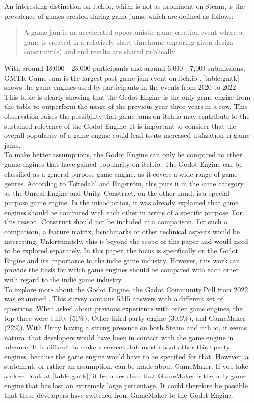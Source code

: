 An interesting distinction on itch.io, which is not as prominent on Steam, is the prevalence of games created during game jams, which are defined as follows:
\blockquote{A game jam is an accelerated opportunistic game creation event where a game is created in a relatively short timeframe exploring given design constraint(s) and end results are shared publically \cite{game-jam-definition}.}
With around 18,000 - 23,000 participants and around 6,000 - 7,000 submissions, GMTK Game Jam is the largest past game jam event on itch.io \cite{gmtk-game-jam-2021, gmtk-game-jam-2022, gmtk-game-jam-2023}.
\autoref{table:gmtk} shows the game engines used by participants in the events from 2020 to 2022.
This table is clearly showing that the Godot Engine is the only game engine from the table to outperform the usage of the previous year three years in a row.
This observation raises the possibility that game jams on itch.io may contribute to the sustained relevance of the Godot Engine.
It is important to consider that the overall popularity of a game engine could lead to its increased utilization in game jams. \\

To make better assumptions, the Godot Engine can only be compared to other game engines that have gained popularity on itch.io.
The Godot Engine can be classified as a general-purpose game engine, as it covers a wide range of game genres.
According to Toftedahl and Engström, this puts it in the same category as the Unreal Engine and Unity.
Construct, on the other hand, is a special purpose game engine.
In the introduction, it was already explained that game engines should be compared with each other in terms of a specific purpose.
For this reason, Construct should not be included in a comparison.
For such a comparison, a feature matrix, benchmarks or other technical aspects would be interesting.
Unfortunately, this is beyond the scope of this paper and would need to be explored separately.
In this paper, the focus is specifically on the Godot Engine and its importance to the indie game industry.
However, this work can provide the basis for which game engines should be compared with each other with regard to the indie game industry.\\

To explore more about the Godot Engine, the Godot Community Poll from 2022 was examined \cite{godot-poll-results}.
This survey contains 5315 answers with a different set of questions.
When asked about previous experience with other game engines, the top three were Unity (51\%), Other third party engine (30.6\%), and GameMaker (22\%).
With Unity having a strong presence on both Steam and itch.io, it seems natural that developers would have been in contact with the game engine in advance.
It is difficult to make a correct statement about other third party engines, because the game engine would have to be specified for that.
However, a statement, or rather an assumption, can be made about GameMaker.
If you take a closer look at \autoref{table:gmtk}, it becomes clear that GameMaker is the only game engine that has lost an extremely large percentage.
It could therefore be possible that these developers have switched from GameMaker to the Godot Engine.\\

